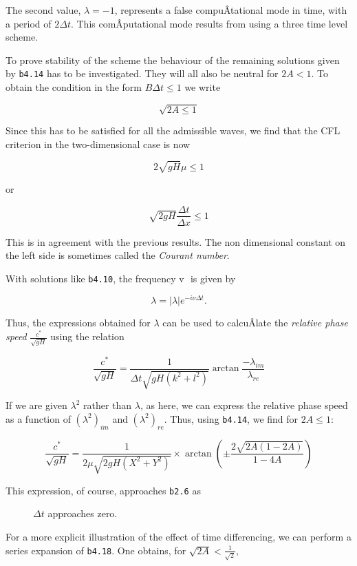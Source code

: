 The second value, \(\lambda = - 1\), represents a false compuÂ­tational
mode in time, with a period of \(2\Delta t\). This comÂ­putational mode
results from using a three time level scheme.

To prove stability of the scheme the behaviour of the remaining
solutions given by \texttt{b4.14} has to be investigated. They will all
also be neutral for \(2A < 1\). To obtain the condition in the form
\(B\Delta t \leq 1\) we write

\[\sqrt{2A \leq 1}\]

Since this has to be satisfied for all the admissible waves, we find
that the CFL criterion in the two-dimensional case is now

{\[2\sqrt{gH}\mu \leq 1\]}

or

{\[\sqrt{2gH}\frac{\Delta t}{\Delta x} \leq 1\]}

This is in agreement with the previous results. The non dimensional
constant on the left side is sometimes called the \emph{Courant number}.

With solutions like \texttt{b4.10}, the frequency \(\text{v }\) is given
by

\[\lambda = \left| \lambda \right|e^{- i\nu\Delta t}.\]

Thus, the expressions obtained for \(\lambda\) can be used to calcuÂ­late
the \emph{relative phase speed} \(\frac{c^{*}}{\sqrt{gH}}\) using the
relation

{\[\frac{c^{*}}{\sqrt{gH}} = \frac{1}{\Delta t\sqrt{gH\left( k^{2} + l^{2} \right)}}\arctan\frac{- \lambda_{im}}{\lambda_{re}}\]}

If we are given \(\lambda^{2}\) rather than \(\lambda\), as here, we can
express the relative phase speed as a function of \((\lambda^{2})_{im}\)
and \((\lambda^{2})_{re}\). Thus, using \texttt{b4.14}, we find for
\(2A \leq 1:\)

{\[\frac{c^*}{\sqrt{gH}} = \frac{1}{2\mu\sqrt{2gH\left( X^{2} + Y^{2} \right)}} \times
 \arctan{ \left( \pm \frac{2\sqrt{2A\left( 1 - 2A \right)}}{1 - 4A} \right)   }\]}

\begin{description}
\item[This expression, of course, approaches \texttt{b2.6} as]
\(\Delta t\) approaches zero.
\end{description}

For a more explicit illustration of the effect of time differencing, we
can perform a series expansion of \texttt{b4.18}. One obtains, for
\(\sqrt{2A} < \frac{1}{\sqrt{2}},\)

